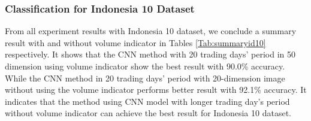 \documentclass[10pt,twocolumn]{article}
\begin{document}
\subsubsection{Classification for Indonesia 10 Dataset}
From all experiment results with Indonesia 10 dataset, we conclude a summary result with and without volume indicator in Tables \ref{Tab:summaryid10} respectively. It shows that the CNN method with 20 trading days’ period in 50 dimension using volume indicator show the best result with 90.0\% accuracy. While the CNN method in 20 trading days’ period with 20-dimension image without using the volume indicator performs better result with 92.1\% accuracy. It indicates that the method using CNN model with longer trading day’s period without volume indicator can achieve the best result for Indonesia 10 dataset.
 \begin{table}[H]
 \centering
 \caption{Summary result of Indonesia 10 with their best classifier for each trading days and image dimension.}
 \label{Tab:summaryid10}
 \end{table}
\end{document}
